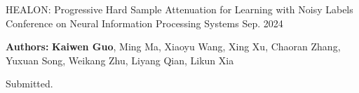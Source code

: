 \begin{cventries}
  \cventry
  {} %
  {HEALON: Progressive Hard Sample Attenuation for Learning with Noisy Labels} %
  {Conference on Neural Information Processing Systems} %
  {Sep. 2024} %
  {
    \begin{cvitems}
      \item{\textbf{Authors:} \textbf{Kaiwen Guo}, Ming Ma, Xiaoyu Wang, Xing Xu, Chaoran Zhang, Yuxuan Song, Weikang Zhu, Liyang Qian, Likun Xia}
      \item{Submitted.}
    \end{cvitems}
  }


\end{cventries}



